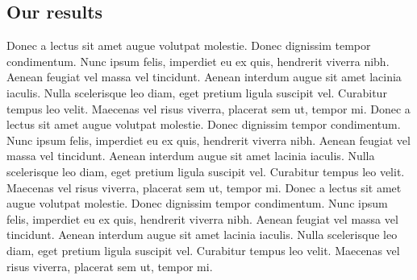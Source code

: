 \documentclass{article}
\begin{document}
\subsection{Our results}
Donec a lectus sit amet augue volutpat molestie. Donec dignissim tempor condimentum. Nunc ipsum felis, imperdiet
eu ex quis, hendrerit viverra nibh. Aenean feugiat vel massa vel tincidunt. Aenean interdum augue sit amet lacinia
iaculis. Nulla scelerisque leo diam, eget pretium ligula suscipit vel. Curabitur tempus leo velit. Maecenas vel
risus viverra, placerat sem ut, tempor mi.
\vspace{5mm}
\newline
Donec a lectus sit amet augue volutpat molestie. Donec dignissim tempor condimentum. Nunc ipsum felis, imperdiet
eu ex quis, hendrerit viverra nibh. Aenean feugiat vel massa vel tincidunt. Aenean interdum augue sit amet lacinia
iaculis. Nulla scelerisque leo diam, eget pretium ligula suscipit vel. Curabitur tempus leo velit. Maecenas vel
risus viverra, placerat sem ut, tempor mi.
\vspace{5mm}
\newline
Donec a lectus sit amet augue volutpat molestie. Donec dignissim tempor condimentum. Nunc ipsum felis, imperdiet
eu ex quis, hendrerit viverra nibh. Aenean feugiat vel massa vel tincidunt. Aenean interdum augue sit amet lacinia
iaculis. Nulla scelerisque leo diam, eget pretium ligula suscipit vel. Curabitur tempus leo velit. Maecenas vel
risus viverra, placerat sem ut, tempor mi.
\end{document}
